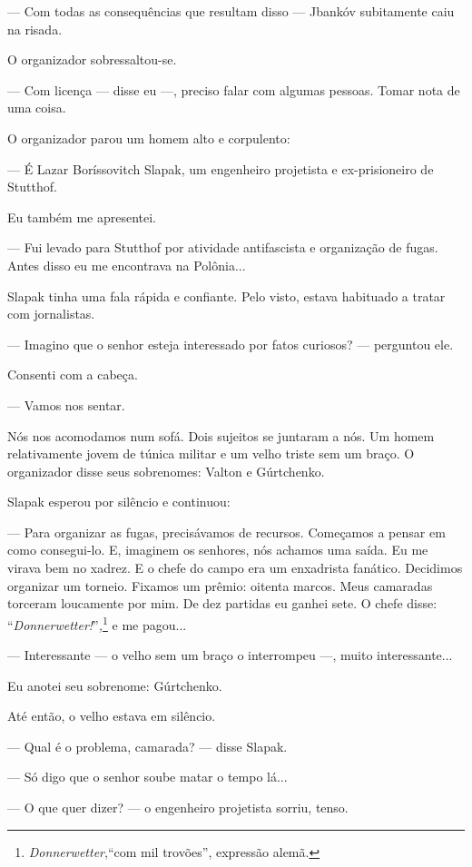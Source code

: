 --- Com todas as consequências que resultam disso --- Jbankóv
subitamente caiu na risada.

O organizador sobressaltou-se.

--- Com licença --- disse eu ---, preciso falar com algumas pessoas.
Tomar nota de uma coisa.

O organizador parou um homem alto e corpulento:

--- É Lazar Boríssovitch Slapak, um engenheiro projetista e
ex-prisioneiro de Stutthof.

Eu também me apresentei.

--- Fui levado para Stutthof por atividade antifascista e organização de
fugas. Antes disso eu me encontrava na Polônia...

Slapak tinha uma fala rápida e confiante. Pelo visto, estava habituado a
tratar com jornalistas.

--- Imagino que o senhor esteja interessado por fatos curiosos? ---
perguntou ele.

Consenti com a cabeça.

--- Vamos nos sentar.

Nós nos acomodamos num sofá. Dois sujeitos se juntaram a nós. Um homem
relativamente jovem de túnica militar e um velho triste sem um braço. O
organizador disse seus sobrenomes: Valton e Gúrtchenko.

Slapak esperou por silêncio e continuou:

--- Para organizar as fugas, precisávamos de recursos. Começamos a
pensar em como consegui-lo. E, imaginem os senhores, nós achamos uma
saída. Eu me virava bem no xadrez. E o chefe do campo era um enxadrista
fanático. Decidimos organizar um torneio. Fixamos um prêmio: oitenta
marcos. Meus camaradas torceram loucamente por mim. De dez partidas eu
ganhei sete. O chefe disse: ``\emph{Donnerwetter!}''\emph{,}\footnote{\emph{Donnerwetter},``com
  mil trovões'', expressão alemã.} e me pagou...

--- Interessante --- o velho sem um braço o interrompeu ---, muito
interessante...

Eu anotei seu sobrenome: Gúrtchenko.

Até então, o velho estava em silêncio.

--- Qual é o problema, camarada? --- disse Slapak.

--- Só digo que o senhor soube matar o tempo lá...

--- O que quer dizer? --- o engenheiro projetista sorriu, tenso.

